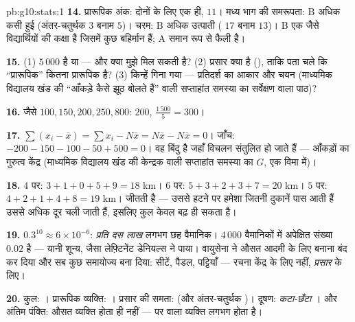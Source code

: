 \begin{solution}{pb:g10:stats:1}
\textbf{14.} प्रारूपिक अंक: दोनों के लिए एक ही,  $11$। मध्य भाग की
समरूपता: B अधिक कसी हुई (अंतर-चतुर्थक  $3$ बनाम $5$)। चरम: B अधिक
उत्पाती ( $17$ बनाम $13$)। B एक जैसे विद्यार्थियों की कक्षा है जिसमें
कुछ बहिर्मान हैं; A समान रूप से फैली है।

\textbf{15.} (1) $5\,000$  है या  --- और क्या मुझे  मिल
सकती है? (2) प्रसार क्या है (), ताकि पता चले कि ``प्रारूपिक'' कितना
प्रारूपिक है? (3) किन्हें गिना गया --- प्रतिदर्श का आकार और चयन (माध्यमिक
विद्यालय खंड की ``आँकड़े कैसे झूठ बोलते हैं'' वाली सप्ताहांत समस्या का
सर्वेक्षण वाला पाठ)?

\textbf{16.} जैसे $100, 150, 200, 250, 800$:  $200$,  $\frac{1\,500}{5} = 300$।

\textbf{17.} $\sum (x_i - \bar x) = \sum x_i - N \bar x =
N\bar x - N\bar x = 0$। जाँच: $-200 - 150 - 100 - 50 + 500 =
0$।  वह बिंदु है जहाँ विचलन संतुलित हो
जाते हैं --- आँकड़ों का गुरुत्व केंद्र (माध्यमिक विद्यालय खंड की केन्द्रक
वाली सप्ताहांत समस्या का $G$, एक विमा में)।

\textbf{18.}  $4$ पर: $3 + 1 + 0 + 5 + 9 = 18$ km।  $6$ पर: $5 + 3 + 2 + 3 + 7 = 20$ km। $5$
पर: $4 + 2 + 1 + 4 + 8 = 19$ km।  जीतती है --- उससे हटने पर हमेशा जितनी दुकानें पास
आती हैं उससे अधिक दूर चली जाती हैं, इसलिए कुल केवल बढ़ ही सकता है।

\textbf{19.} $0.3^{10} \approx 6 \times 10^{-6}$: \emph{प्रति दस लाख} लगभग छह वैमानिक। $4\,000$ वैमानिकों
में अपेक्षित संख्या $0.02$ है --- यानी शून्य, जैसा लेफ़्टिनेंट डेनियल्स ने
पाया। वायुसेना ने औसत आदमी के लिए बनाना बंद कर दिया और सब कुछ समायोज्य बना
दिया: सीटें, पैडल, पट्टियाँ --- रचना केंद्र के लिए नहीं, \emph{प्रसार} के
लिए।

\textbf{20.} कुल: \emph{}। प्रारूपिक व्यक्ति: \emph{}। प्रसार
की समता: \emph{} (और अंतर-चतुर्थक )। दूषण: \emph{कटा-छँटा
}। और अंतिम पंक्ति: औसत व्यक्ति होता ही नहीं --- पर  वाला
व्यक्ति लगभग होता है।
\end{solution}
